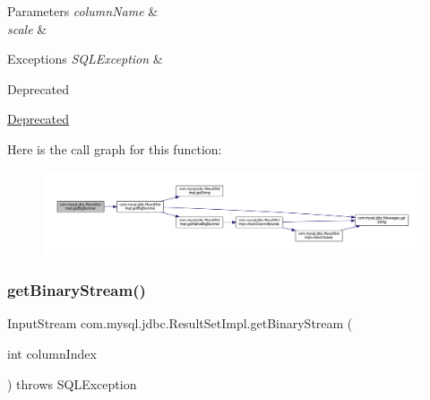 \begin{DoxyParams}{Parameters}
{\em column\+Name} & \\
\hline
{\em scale} & \\
\hline
\end{DoxyParams}

\begin{DoxyExceptions}{Exceptions}
{\em S\+Q\+L\+Exception} & \\
\hline
\end{DoxyExceptions}
\begin{DoxyRefDesc}{Deprecated}
\item[\mbox{\hyperlink{deprecated__deprecated000019}{Deprecated}}]\end{DoxyRefDesc}
Here is the call graph for this function\+:
\nopagebreak
\begin{figure}[H]
\begin{center}
\leavevmode
\includegraphics[width=350pt]{classcom_1_1mysql_1_1jdbc_1_1_result_set_impl_af0f4488c8af3d0ce0ca5c9e38c265365_cgraph}
\end{center}
\end{figure}
\mbox{\label{classcom_1_1mysql_1_1jdbc_1_1_result_set_impl_a59faa6b2172c9dafdc26ea397bc4fc93}} 
\subsubsection{\texorpdfstring{get\+Binary\+Stream()}{getBinaryStream()}\hspace{0.1cm}{\footnotesize\ttfamily [1/2]}}
{\footnotesize\ttfamily Input\+Stream com.\+mysql.\+jdbc.\+Result\+Set\+Impl.\+get\+Binary\+Stream (\begin{DoxyParamCaption}\item[{int}]{column\+Index }\end{DoxyParamCaption}) throws S\+Q\+L\+Exception}


